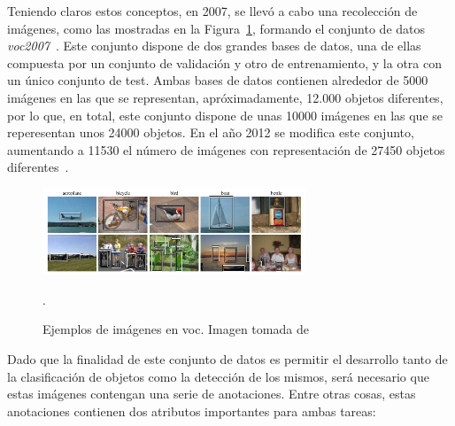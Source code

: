 Teniendo claros estos conceptos, en 2007, se llevó a cabo una recolección de imágenes, como las mostradas en la Figura~\ref{fig.voc_example}, formando el conjunto de datos \textit{\acrshort{voc}}\textit{2007}~\cite{pascal-voc-2007}. Este conjunto dispone de dos grandes bases de datos, una de ellas compuesta por un conjunto de validación y otro de entrenamiento, y la otra con un único conjunto de test. Ambas bases de datos contienen alrededor de 5000 imágenes en las que se representan, apróximadamente, 12.000 objetos diferentes, por lo que, en total, este conjunto dispone de unas 10000 imágenes en las que se reperesentan unos 24000 objetos. En el año 2012 se modifica este conjunto, aumentando a 11530 el número de imágenes con representación de 27450 objetos diferentes~\cite{pascal-voc-2012}.

\begin{figure}[H]
	\begin{center}
		\includegraphics[width=0.7\textwidth]{figures/vocexample}
		\caption{Ejemplos de imágenes en \acrshort{voc}. Imagen tomada de~\cite{Everingham10}}.
		\label{fig.voc_example}
	\end{center}
\end{figure}

Dado que la finalidad de este conjunto de datos es permitir el desarrollo tanto de la clasificación de objetos como la detección de los mismos, será necesario que estas imágenes contengan una serie de anotaciones. Entre otras cosas, estas anotaciones contienen dos atributos importantes para ambas tareas:

